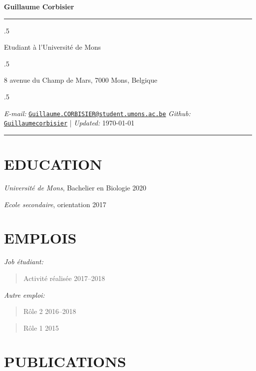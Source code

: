 \documentclass[10pt,]{article}
\begin{document}
\centerline{\huge \bf Guillaume Corbisier}

\vspace{2 mm}

\hrule

\vspace{2 mm}

\moveleft.5\hoffset\centerline{Etudiant à l'Université de Mons}
\moveleft.5\hoffset\centerline{8 avenue du Champ de Mars, 7000 Mons, Belgique}
\moveleft.5\hoffset\centerline{ \emph{E-mail:} \href{mailto:}{\tt \href{mailto:Guillaume.CORBISIER@student.umons.ac.be}{\nolinkurl{Guillaume.CORBISIER@student.umons.ac.be}}} \hspace{1 mm}  \emph{Github:} \href{http://github.com/Guillaumecorbisier}{\tt Guillaumecorbisier} \hspace{1 mm}      | \emph{Updated:} \today}

\vspace{2 mm}

\hrule


\section{EDUCATION}\label{education}

\emph{Université de Mons}, Bachelier en Biologie \hfill 2020

\emph{Ecole secondaire}, orientation \hfill 2017

\section{EMPLOIS}\label{emplois}

\emph{Job étudiant:}

\begin{quote}
Activité réalisée \hfill 2017--2018
\end{quote}

\emph{Autre emploi:}

\begin{quote}
Rôle 2 \hfill 2016--2018
\end{quote}

\begin{quote}
Rôle 1 \hfill 2015
\end{quote}

\section{PUBLICATIONS}\label{publications}
\end{document}
